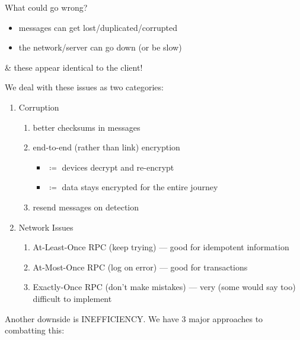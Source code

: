 \documentclass[../../lecture_notes.tex]{subfiles}
\begin{document}
What could go wrong?
\begin{itemize}
\item messages can get lost/duplicated/corrupted
\item the network/server can go down (or be slow)
\end{itemize}
\& these appear identical to the client!


We deal with these issues as two categories:
\begin{enumerate}
\item Corruption
	\begin{enumerate}
		\item better checksums in messages
		\item end-to-end (rather than link) encryption
		\begin{itemize}
			\item {} $\coloneqq$ devices decrypt and re-encrypt
			\item {} $\coloneqq$ data stays encrypted for the entire journey
		\end{itemize}
		\item resend messages on detection 
	\end{enumerate}
\item Network Issues
	\begin{enumerate}
		\item At-Least-Once RPC (keep trying) --- good for idempotent information
		\item At-Most-Once RPC (log on error) --- good for transactions
		\item Exactly-Once RPC (don’t make mistakes) --- very (some would say too) difficult to implement
	\end{enumerate}
\end{enumerate}

Another downside is INEFFICIENCY. We have 3 major approaches to combatting this:
\end{document}
